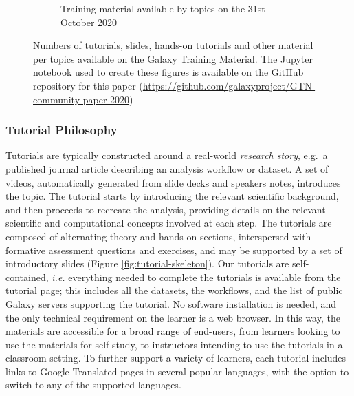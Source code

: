 \documentclass[10pt,letterpaper]{article}
\begin{document}
\begin{figure}[!ht]
\begin{subfigure}[b]{0.4\textwidth}
         \caption{Training material available by topics on the 31st October 2020}
         \label{fig:material-number}
    \end{subfigure}
	\caption{Numbers of tutorials, slides, hands-on tutorials and other material per topics available on the Galaxy Training Material. The Jupyter notebook used to create these figures is available on the GitHub repository for this paper (\url{https://github.com/galaxyproject/GTN-community-paper-2020})}
	\label{fig:material}
\end{figure}

\subsubsection*{Tutorial Philosophy}

Tutorials are typically constructed around a real-world \emph{research story}, e.g.\ a published journal article describing an analysis workflow or dataset. A set of videos, automatically generated from slide decks and speakers notes, introduces the topic.
The tutorial starts by introducing the relevant scientific background, and then proceeds to recreate the analysis, providing details on the relevant scientific and computational concepts involved at each step.
The tutorials are composed of alternating theory and hands-on sections, interspersed with formative assessment questions and exercises, and may be supported by a set of introductory slides (Figure \ref{fig:tutorial-skeleton}).
Our tutorials are self-contained, \textit{i.e.} everything needed to complete the tutorials is available from the tutorial page; this includes all the datasets, the workflows, and the list of public Galaxy servers supporting the tutorial. No software installation is needed, and the only technical requirement on the learner is a web browser. 
In this way, the materials are accessible for a broad range of end-users, from learners looking to use the materials for self-study, to instructors intending to use the tutorials in a classroom setting. To further support a variety of learners, each tutorial includes links to Google Translated pages in several popular languages, with the option to switch to any of the supported languages.
\end{document}
